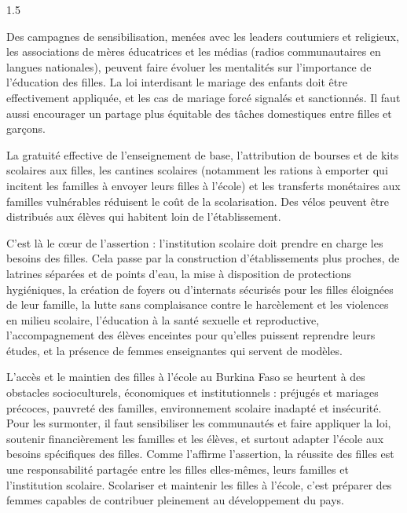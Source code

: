 \documentclass[12pt]{article}
\begin{document}
\begin{spacing}{1.5}


Des campagnes de sensibilisation, menées avec les leaders coutumiers et religieux, les associations de mères éducatrices et les médias (radios communautaires en langues nationales), peuvent faire évoluer les mentalités sur l'importance de l'éducation des filles. La loi interdisant le mariage des enfants doit être effectivement appliquée, et les cas de mariage forcé signalés et sanctionnés. Il faut aussi encourager un partage plus équitable des tâches domestiques entre filles et garçons.

La gratuité effective de l'enseignement de base, l'attribution de bourses et de kits scolaires aux filles, les cantines scolaires (notamment les rations à emporter qui incitent les familles à envoyer leurs filles à l'école) et les transferts monétaires aux familles vulnérables réduisent le coût de la scolarisation. Des vélos peuvent être distribués aux élèves qui habitent loin de l'établissement.

C'est là le cœur de l'assertion : l'institution scolaire doit prendre en charge les besoins des filles. Cela passe par la construction d'établissements plus proches, de latrines séparées et de points d'eau, la mise à disposition de protections hygiéniques, la création de foyers ou d'internats sécurisés pour les filles éloignées de leur famille, la lutte sans complaisance contre le harcèlement et les violences en milieu scolaire, l'éducation à la santé sexuelle et reproductive, l'accompagnement des élèves enceintes pour qu'elles puissent reprendre leurs études, et la présence de femmes enseignantes qui servent de modèles.


L'accès et le maintien des filles à l'école au Burkina Faso se heurtent à des obstacles socioculturels, économiques et institutionnels : préjugés et mariages précoces, pauvreté des familles, environnement scolaire inadapté et insécurité. Pour les surmonter, il faut sensibiliser les communautés et faire appliquer la loi, soutenir financièrement les familles et les élèves, et surtout adapter l'école aux besoins spécifiques des filles. Comme l'affirme l'assertion, la réussite des filles est une responsabilité partagée entre les filles elles-mêmes, leurs familles et l'institution scolaire. Scolariser et maintenir les filles à l'école, c'est préparer des femmes capables de contribuer pleinement au développement du pays.

\end{spacing}
\end{document}
